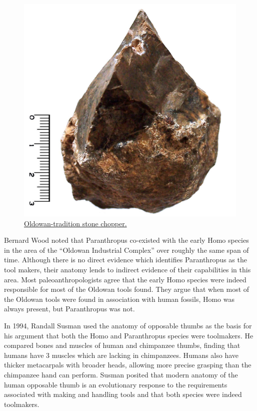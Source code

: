 \begin{figure}

{\centering \includegraphics[width=0.7\linewidth]{./figures/animals/Oldowan_tradition_chopper} 

}

\caption{\href{https://commons.wikimedia.org/wiki/File:Oldowan_tradition_chopper.jpg}{Oldowan-tradition stone chopper.}}\label{fig:oldowan}
\end{figure}

Bernard Wood noted that Paranthropus co-existed with the early Homo species in the area of the ``Oldowan Industrial Complex'' over roughly the same span of time. Although there is no direct evidence which identifies Paranthropus as the tool makers, their anatomy lends to indirect evidence of their capabilities in this area. Most paleoanthropologists agree that the early Homo species were indeed responsible for most of the Oldowan tools found. They argue that when most of the Oldowan tools were found in association with human fossils, Homo was always present, but Paranthropus was not.

In 1994, Randall Susman used the anatomy of opposable thumbs as the basis for his argument that both the Homo and Paranthropus species were toolmakers. He compared bones and muscles of human and chimpanzee thumbs, finding that humans have 3 muscles which are lacking in chimpanzees. Humans also have thicker metacarpals with broader heads, allowing more precise grasping than the chimpanzee hand can perform. Susman posited that modern anatomy of the human opposable thumb is an evolutionary response to the requirements associated with making and handling tools and that both species were indeed toolmakers.

